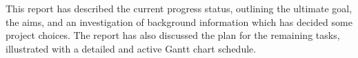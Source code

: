 This report has described the current progress status, outlining the ultimate goal, the aims, and an investigation of background information which has decided some project choices. The report has also discussed the plan for the remaining tasks, illustrated with a detailed and active Gantt chart schedule.